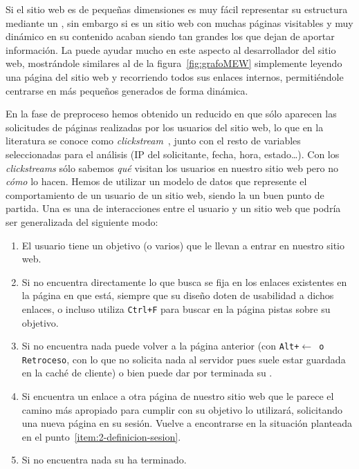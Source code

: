 Si el sitio web es de pequeñas dimensiones es muy fácil representar su estructura mediante un \grafo, sin embargo si es un sitio web con muchas páginas visitables y muy dinámico en su contenido acaban siendo tan grandes los \grafos que dejan de aportar información. La \wsm puede ayudar mucho en este aspecto al desarrollador del sitio web, mostrándole \grafos similares al de la figura~\ref{fig:grafoMEW} simplemente leyendo una página del sitio web y recorriendo todos sus enlaces internos, permitiéndole centrarse en \grafos más pequeños generados de forma dinámica.





En la fase de preproceso hemos obtenido un \flog reducido en que sólo aparecen las solicitudes de páginas realizadas por los usuarios del sitio web, lo que en la literatura se conoce como \emph{clickstream}~\citep{BucklinSismeiro_AModelOfWebSiteBrowsing_2001}, junto con el resto de variables seleccionadas para el análisis (IP del solicitante, fecha, hora, estado\ldots). Con los \emph{clickstreams} sólo sabemos \emph{qué} visitan los usuarios en nuestro sitio web pero no \emph{cómo} lo hacen. Hemos de utilizar un modelo de datos que represente el comportamiento de un usuario de un sitio web, siendo la \sn un buen punto de partida. Una \sn es una \secuencia de interacciones entre el usuario y un sitio web que podría ser generalizada del siguiente modo:
\begin{enumerate}
	\item El usuario tiene un objetivo (o varios) que le llevan a entrar en nuestro sitio web.
	\item Si no encuentra directamente lo que busca se fija en los enlaces existentes en la página en que está, siempre que su diseño doten de usabilidad a dichos enlaces, o incluso utiliza \texttt{Ctrl+F} para buscar en la página pistas sobre su objetivo.\label{item:2-definicion-sesion}
   \item Si no encuentra nada puede volver a la página anterior (con \texttt{Alt+$\leftarrow$ o \texttt{Retroceso}}, con lo que no solicita nada al servidor pues suele estar guardada en la caché de cliente) o bien puede dar por terminada su \sn.
	\item Si encuentra un enlace a otra página de nuestro sitio web que le parece el camino más apropiado para cumplir con su objetivo lo utilizará, solicitando una nueva página en su sesión. Vuelve a encontrarse en la situación planteada en el punto~\ref{item:2-definicion-sesion}.
   \item Si no encuentra nada su \sn ha terminado.
\end{enumerate}

